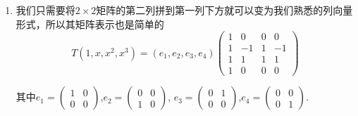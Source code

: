 \documentclass[12pt,fontset=fandol]{ctexart}
\begin{document}
\begin{solve}
\begin{enumerate}
                \item 我们只需要将$2 \times 2$矩阵的第二列拼到第一列下方就可以变为我们熟悉的列向量形式，所以其矩阵表示也是简单的
                      \[
                        T(1,x,x^2,x^3)=(e_1,e_2,e_3,e_4)\begin{pmatrix}
                            1 & 0 & 0 & 0 \\
                            1 & -1 & 1 & -1 \\
                            1 & 1 & 1 & 1 \\
                            1 & 0 & 0 & 0
                        \end{pmatrix}
                      \]

                      其中$e_1=\begin{pmatrix}1&0\\0&0\end{pmatrix}$,$e_2=\begin{pmatrix}0&0\\1&0\end{pmatrix}$,
                      $e_3=\begin{pmatrix}0&1\\0&0\end{pmatrix}$,$e_4=\begin{pmatrix}0&0\\0&1\end{pmatrix}$.
            \end{enumerate}
\end{solve}
\end{document}

